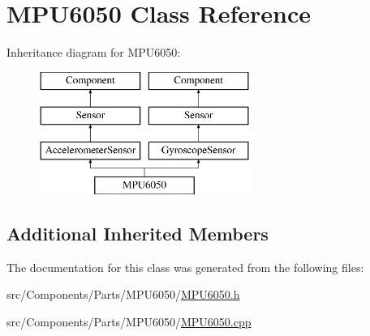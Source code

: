 \hypertarget{classMPU6050}{}\section{M\+P\+U6050 Class Reference}
\label{classMPU6050}
Inheritance diagram for M\+P\+U6050\+:\begin{figure}[H]
\begin{center}
\leavevmode
\includegraphics[height=4.000000cm]{classMPU6050}
\end{center}
\end{figure}
\subsection*{Additional Inherited Members}


The documentation for this class was generated from the following files\+:\begin{DoxyCompactItemize}
\item 
src/\+Components/\+Parts/\+M\+P\+U6050/\hyperlink{MPU6050_8h}{M\+P\+U6050.\+h}\item 
src/\+Components/\+Parts/\+M\+P\+U6050/\hyperlink{MPU6050_8cpp}{M\+P\+U6050.\+cpp}\end{DoxyCompactItemize}
